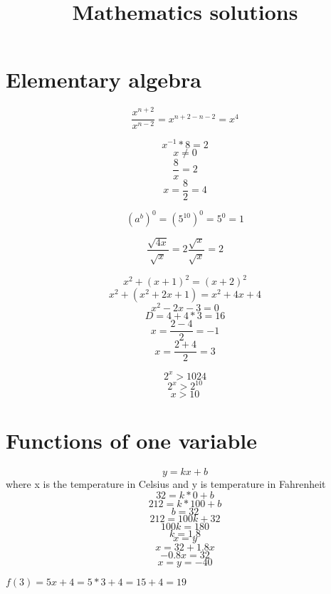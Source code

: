 \documentclass[10pt]{article}
\newenvironment{problem}[2][Problem]{\begin{trivlist}
\item[\hskip \labelsep {\bfseries #1}\hskip \labelsep {\bfseries #2.}]}{\end{trivlist}}
\begin{document}
 
\title{Mathematics solutions}
\date{}
\maketitle

 \section{Elementary algebra}
 
\begin{problem}{1.1}
 $$\frac{x^{n+2}}{x^{n-2}}=x^{n+2-n-2}=x^4$$
\end{problem}

\begin{problem}{1.2}
$$x^{-1}*8=2$$ $${x}\neq{0}$$
$$\frac{8}{x}=2$$ 
$${x}=\frac{8}{2}=4$$

\end{problem}

\begin{problem}{1.3}
$$(a^b)^0=(5^10)^0=5^0=1$$
\end{problem}

\begin{problem}{1.4}
$$\frac{\sqrt{4x}}{\sqrt{x}}=2\frac{\sqrt{x}}{\sqrt{x}}=2$$
\end{problem}

\begin{problem}{1.5}
$$x^2+(x+1)^2=(x+2)^2$$
$$x^2+(x^2+2x+1)=x^2+4x+4$$
$$x^2-2x-3=0$$
$$D=4+4*3=16$$
$$x=\frac{2-4}{2}=-1$$
$$x=\frac{2+4}{2}=3$$
\end{problem}

\begin{problem}{1.6}
$$2^x>1024$$
$$2^x>2^10$$
$$x>10$$
\end{problem}

\section{Functions of one variable}

\begin{problem}{2.1 (Based on SYD 2.5.6)}
$$y=kx+b$$
where x is the temperature in Celsius and y is temperature in Fahrenheit 
$$32=k*0+b$$
$$212=k*100+b$$
$$b=32$$
$$212=100k+32$$
$$100k=180$$
$$k=1.8$$
$$x=y$$
$$x=32+1.8x$$
$$-0.8x=32$$
$$x=y=-40$$
\end{problem}

\begin{problem}{2.2}
$f(3)=5x+4=5*3+4=15+4=19$
\end{problem}
\end{document}
